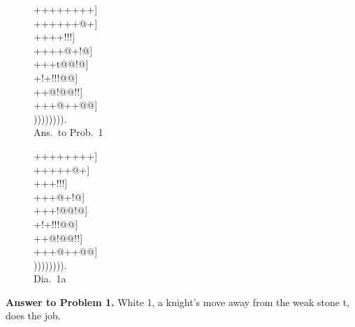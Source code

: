 \documentclass[mcrownvopaper,10pt,twopage,onecolumn,draft,showtrims]{memoir}
\begin{document}
\begin{figure}[ht]
    \begin{minipage}[c]{0.5\linewidth}
        \centering    
        {\gnos%
        ++++++++]\\
        ++++++@+]\\
        ++{\gnosw{}}++!!!]\\
        ++++@+!@]\\
        +++t@@!@]\\
        +!+!!!@@]\\
        ++@!@@!!]\\
        +++@++@@]\\
        )))))))).\\
        }
        Ans.\ to Prob.\ 1
    \end{minipage}%
    \begin{minipage}[c]{0.5\linewidth}
        \centering    
        {\gnos%
        ++++++++]\\
        +++{\gnosw{}}++@+]\\
        ++{\gnosb{}}{\gnosw{}}+!!!]\\
        +++{\gnosb{}}@+!@]\\
        +++!@@!@]\\
        +!+!!!@@]\\
        ++@!@@!!]\\
        +++@++@@]\\
        )))))))).\\
        }
        Dia.\ 1a
    \end{minipage}
\end{figure}
\noindent
\textbf{Answer to Problem 1.} White 1, a knight's move away from the weak
stone {\gnos t}, does the job.
\end{document}
